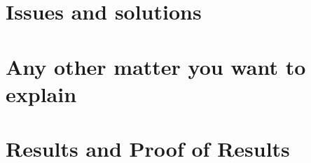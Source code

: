 \documentclass[conference]{IEEEtran}
\begin{document}
\section{Issues and solutions}

\section{Any other matter you want to explain}

\section{Results and Proof of Results}
\end{document}
